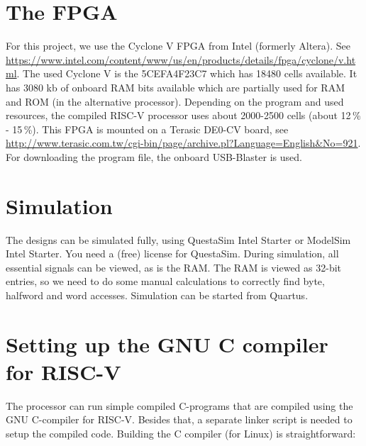 \documentclass[12pt]{article}
\begin{document}
\section{The FPGA}
For this project, we use the Cyclone V FPGA from Intel (formerly Altera). See \url{https://www.intel.com/content/www/us/en/products/details/fpga/cyclone/v.html}.
The used Cyclone V is the 5CEFA4F23C7 which has 18480 cells available. It has 3080 kb of onboard RAM bits available which are partially used for RAM and ROM (in the alternative processor). Depending on the program and used resources, the compiled RISC-V processor uses about 2000-2500 cells (about 12\,\% - 15\,\%). This FPGA is mounted on a Terasic DE0-CV board, see \url{http://www.terasic.com.tw/cgi-bin/page/archive.pl?Language=English&No=921}. For downloading the program file, the onboard USB-Blaster is used.

\section{Simulation}
The designs can be simulated fully, using QuestaSim Intel Starter or ModelSim Intel Starter. You need a (free) license for QuestaSim. During simulation, all essential signals can be viewed, as is the RAM. The RAM is viewed as 32-bit entries, so we need to do some manual calculations to correctly find byte, halfword and word accesses. Simulation can be started from Quartus.

\section{Setting up the GNU C compiler for RISC-V}
The processor can run simple compiled C-programs that are compiled using the GNU C-compiler for RISC-V. Besides that, a separate linker script is needed to setup the compiled code. Building the C compiler (for Linux) is straightforward:
\end{document}
